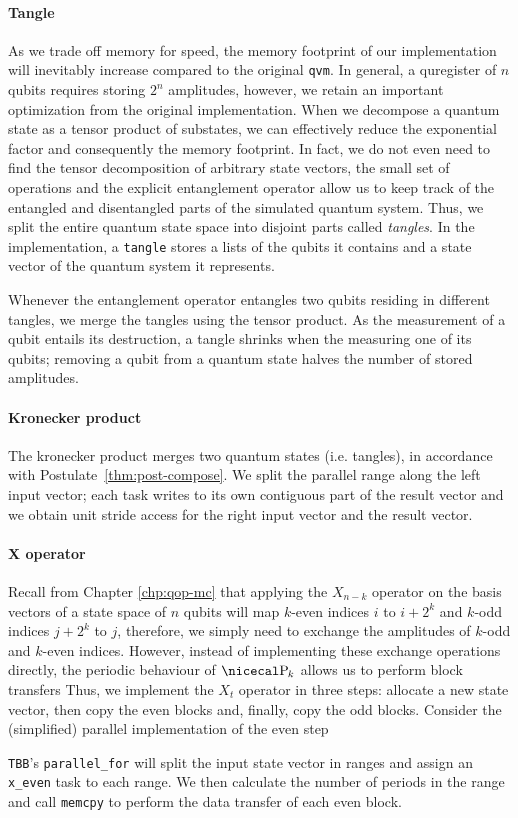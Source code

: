 \documentclass[a4paper,11pt, oneside]{report}
\newcommand{\code}[1]{\texttt{#1}}
\newcommand{\concept}[1]{\emph{#1}}
\begin{document}
\paragraph{Tangle} As we trade off memory for speed, the memory footprint of our implementation will inevitably increase compared to the original \code{qvm}. In general, a quregister of $n$ qubits requires storing $2^n$ amplitudes, however, we retain an important optimization from the original implementation. When we decompose a quantum state as a tensor product of substates, we can effectively reduce the exponential factor and consequently the memory footprint. In fact, we do not even need to find the tensor decomposition of arbitrary state vectors, the small set of operations and the explicit entanglement operator allow us to keep track of the entangled and disentangled parts of the simulated quantum system. Thus, we split the entire quantum state space into disjoint parts called \concept{tangles}. In the implementation, a \code{tangle} stores a lists of the qubits it contains and a state vector of the quantum system it represents.

Whenever the entanglement operator entangles two qubits residing in different tangles, we merge the tangles using the tensor product. As the measurement of a qubit entails its destruction, a tangle shrinks when the measuring one of its qubits; removing a qubit from a quantum state halves the number of stored amplitudes.

\paragraph{Kronecker product} The kronecker product merges two quantum states (i.e. tangles), in accordance with Postulate~\ref{thm:post-compose}. We split the parallel range along the left input vector; each task writes to its own contiguous part of the result vector and we obtain unit stride access for the right input vector and the result vector.



\paragraph{X operator} Recall from Chapter \ref{chp:qop-mc} that applying the $X_{n-k}$ operator on the basis vectors of a state space of $n$ qubits will map $k$-even indices $i$ to $i + 2^k$ and $k$-odd indices $j + 2^k$ to $j$, therefore, we simply need to exchange the amplitudes of $k$-odd and $k$-even indices. However, instead of implementing these exchange operations directly, the periodic behaviour of $\parity_k$ allows us to perform block transfers
Thus, we implement the $X_t$ operator in three steps: allocate a new state vector, then copy the even blocks and, finally, copy the odd blocks. Consider the (simplified) parallel implementation of the even step

\code{TBB}'s \code{parallel\_for} will split the input state vector in ranges and assign an \code{x\_even} task to each range. We then calculate the number of periods in the range and call \code{memcpy} to perform the data transfer of each even block.
\end{document}
